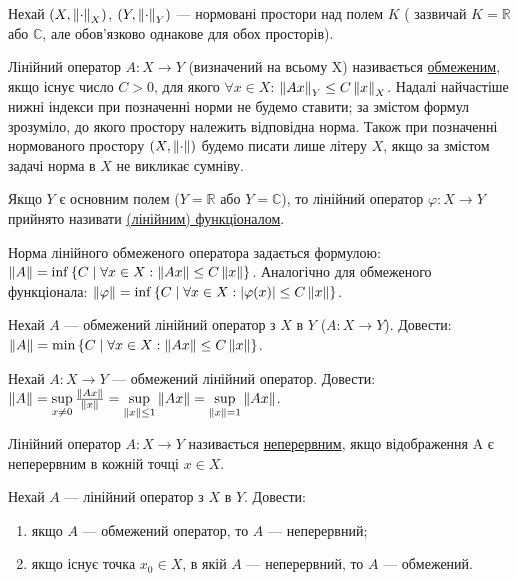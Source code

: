 
\begin{theory}
    Нехай $(X, \left\lVert\cdot\right\rVert_X)$, $(Y, \left\lVert\cdot\right\rVert_Y)$ --- нормовані простори над полем $K$ (
        зазвичай $K = 
    \mathbb{R}$ або $\mathbb{C}$, 
    але обов'язково однакове для обох просторів). 

    Лінійний оператор $A: X \rightarrow Y$ (визначений на всьому X) називається 
    \underline{обмеженим}, якщо існує число $C > 0$, для якого $\forall x \in X$: 
    $\left\lVert Ax\right\rVert_Y \leq C \left\lVert x\right\rVert_X$. Надалі найчастіше нижні індекси при позначенні норми 
    не будемо ставити; за змістом формул зрозуміло, до якого простору належить відповідна 
    норма. Також при позначенні нормованого простору $(X, \left\lVert\cdot\right\rVert)$ будемо писати лише 
    літеру $X$, якщо за змістом задачі норма в $X$ не викликає сумніву. 

    Якщо $Y$ є основним полем ($Y=\mathbb{R}$ або $Y = \mathbb{C}$), то лінійний оператор 
    $\varphi: X \rightarrow Y$ прийнято називати \underline{(лінійним) функціоналом}.

    Норма лінійного обмеженого оператора задається формулою:
    $\left\lVert A\right\rVert = \inf\left\{C\;|\;\forall x \in X : \left\lVert Ax\right\rVert\leq C\left\lVert x\right\rVert \right\}$.
    Аналогічно для обмеженого функціонала:
    $\left\lVert\varphi\right\rVert = \inf\left\{C \;|\; \forall x \in X : |\varphi(x)| \leq C\left\lVert x\right\rVert \right\}$.
\end{theory}

\begin{exercise}
    Нехай $A$ --- обмежений лінійний оператор з $X$ в $Y$ ($A: X \rightarrow Y$).
    Довести: $\left\lVert A\right\rVert = \min\left\{C \mid \forall x \in X : \left\lVert Ax\right\rVert \leq C\left\lVert x\right\rVert\right\}$.
\end{exercise}

\begin{exercise}
    Нехай $A: X \rightarrow Y$ --- обмежений лінійний оператор.
    Довести: $\left\lVert A\right\rVert = \sup\limits_{x \neq 0}\frac{\left\lVert Ax\right\rVert}{\left\lVert x\right\rVert} = 
    \sup\limits_{\left\lVert x\right\rVert \leq 1}\left\lVert Ax\right\rVert = \sup\limits_{\left\lVert x\right\rVert = 1}\left\lVert Ax\right\rVert$.
\end{exercise}

\begin{theory}
    Лінійний оператор $A: X \rightarrow Y$ називається \underline{неперервним}, якщо відображення 
    A є неперервним в кожній точці $x \in X$.
\end{theory}

\begin{exercise}
    Нехай $A$ --- лінійний оператор з $X$ в $Y$. Довести: 
    \begin{enumerate}[label=\alph*)]
        \item якщо $A$ --- обмежений оператор, то $A$ --- неперервний;
        \item якщо існує точка $x_0 \in X$, в якій $A$ --- неперервний, то $A$ --- обмежений.
    \end{enumerate}
\end{exercise}

